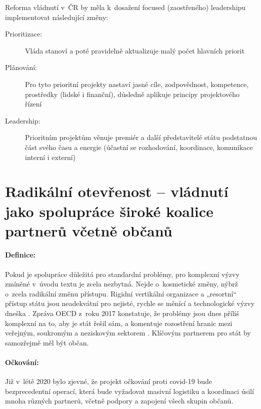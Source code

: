 Reforma vládnutí v~ČR by měla k~dosažení focused (zaostřeného) leadershipu
implementovat následující změny:
\begin{description}
  \item[Prioritizace:] Vláda stanoví a poté pravidelně aktualizuje malý počet hlavních priorit
  \item[Plánování:] Pro tyto prioritní projekty nastaví jasné cíle, zodpovědnost, kompetence, prostředky (lidské i finanční), důsledně aplikuje principy projektového řízení
  \item[Leadership:] Prioritním projektům věnuje premiér a další představitelé státu podstatnou část svého času a energie (účastní se rozhodování, koordinace, komunikace interní i externí)
\end{description}

\section*{Radikální otevřenost -- vládnutí jako spolupráce široké koalice partnerů včetně občanů}

\paragraph{Definice:}Pokud je spolupráce důležitá pro standardní problémy, pro komplexní výzvy zmíněné v~úvodu textu je zcela nezbytná. Nejde o~kosmetické změny, nýbrž o~zcela radikální změnu přístupu. Rigidní vertikální organizace a „resortní“ přístup státu jsou neadekvátní pro nejisté, rychle se měnící a technologické výzvy dneška \cite{d_eggers_future_2020}. Zpráva OECD z~roku 2017 konstatuje, že problémy jsou dnes příliš komplexní na to, aby je stát řešil sám, a komentuje rozostření hranic mezi veřejným, soukromým a neziskovým sektorem \cite{oecd_public_governance_reviews_skills_2020}. Klíčovým partnerem pro stát by samozřejmě měl být občan.

\paragraph{Očkování:} Již v~létě 2020 bylo zjevné, že projekt očkování proti covid-19 bude bezprecedentní operací, která bude vyžadovat masivní logistiku a koordinaci úsilí mnoha různých partnerů, včetně podpory a zapojení všech skupin občanů.

